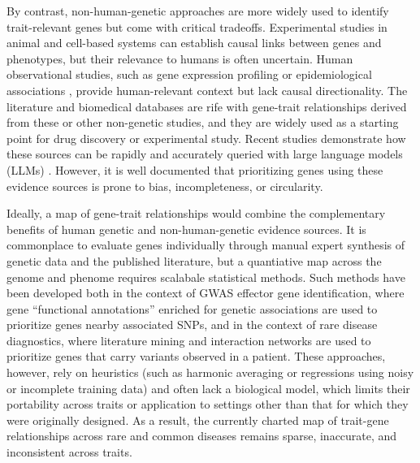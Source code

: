 By contrast, non-human-genetic approaches are more widely used to identify trait-relevant genes but come with critical tradeoffs. Experimental studies in animal \cite{seok_genomic_2013,widjaja_inhibiting_2019} and cell-based \cite{ben-david_genetic_2018,canon_clinical_2019} systems can establish causal links between genes and phenotypes, but their relevance to humans is often uncertain. Human observational studies, such as gene expression profiling \cite{wu_integrating_2022,rodriguez_machine_2021} or epidemiological associations \cite{barter_cholesteryl_2011,bhatt_cardiovascular_2019}, provide human-relevant context but lack causal directionality. The literature and biomedical databases are rife with gene-trait relationships derived from these or other non-genetic studies, and they are widely used as a starting point for drug discovery or experimental study\cite{swinney_how_2011,dornbos_evaluating_2022}. Recent studies demonstrate how these sources can be rapidly and accurately queried with large language models (LLMs) \cite{toufiq_harnessing_2023,hu_evaluation_2025}. However, it is well documented that prioritizing genes using these evidence sources is prone to bias, incompleteness, or circularity\cite{brito_removing_2011,gillis_assessing_2013,gaudet_removing_2017,dunham_human_2018,haynes_gene_2018,stoeger_large_2018,richardson_meta_2024,tan_caution_2025}.

Ideally, a map of gene-trait relationships would combine the complementary benefits of human genetic and non-human-genetic evidence sources. It is commonplace to evaluate genes individually through manual expert synthesis of genetic data and the published literature\cite{mountjoy_open_2022,karjalainen_genome-wide_2024}, but a quantiative map across the genome and phenome requires scalabale statistical methods. Such methods have been developed both in the context of GWAS effector gene identification, where gene ``functional annotations'' enriched for genetic associations are used to prioritize genes nearby associated SNPs\cite{pers_biological_2015,weeks_leveraging_2023}, and in the context of rare disease diagnostics, where literature mining \cite{birgmeier_amelie_2020} and interaction networks\cite{smedley_next-generation_2015} are used to prioritize genes that carry variants observed in a patient. These approaches, however, rely on heuristics (such as harmonic averaging \cite{buniello_open_2025} or regressions using noisy or incomplete training data\cite{weeks_leveraging_2023,schipper_prioritizing_2025}) and often lack a biological model, which limits their portability across traits or application to settings other than that for which they were originally designed. As a result, the currently charted map of trait-gene relationships across rare and common diseases remains sparse, inaccurate, and inconsistent across traits.

